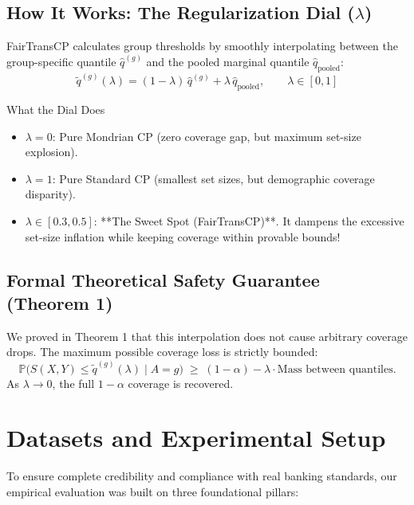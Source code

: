 \documentclass[11pt,a4paper]{article}
\begin{document}
\subsection{How It Works: The Regularization Dial ($\lambda$)}
FairTransCP calculates group thresholds by smoothly interpolating between the group-specific quantile $\hat{q}^{(g)}$ and the pooled marginal quantile $\hat{q}_{\text{pooled}}$:
\[
\boxed{\tilde{q}^{(g)}(\lambda) = (1 - \lambda)\,\hat{q}^{(g)} + \lambda\,\hat{q}_{\text{pooled}}, \qquad \lambda \in [0, 1]}
\]

\begin{solutionbox}{What the Dial Does}
\begin{itemize}[leftmargin=1.5em]
    \item $\lambda = 0$: Pure Mondrian CP (zero coverage gap, but maximum set-size explosion).
    \item $\lambda = 1$: Pure Standard CP (smallest set sizes, but demographic coverage disparity).
    \item $\lambda \in [0.3, 0.5]$: **The Sweet Spot (FairTransCP)**. It dampens the excessive set-size inflation while keeping coverage within provable bounds!
\end{itemize}
\end{solutionbox}

\subsection{Formal Theoretical Safety Guarantee (Theorem 1)}
We proved in Theorem 1 that this interpolation does not cause arbitrary coverage drops. The maximum possible coverage loss is strictly bounded:
\[
\mathbb{P}\bigl(S(X,Y) \le \tilde{q}^{(g)}(\lambda) \mid A = g\bigr) \;\ge\; (1 - \alpha) - \lambda \cdot \text{Mass between quantiles}.
\]
As $\lambda \to 0$, the full $1-\alpha$ coverage is recovered.

\section{Datasets and Experimental Setup}

To ensure complete credibility and compliance with real banking standards, our empirical evaluation was built on three foundational pillars:
\end{document}
